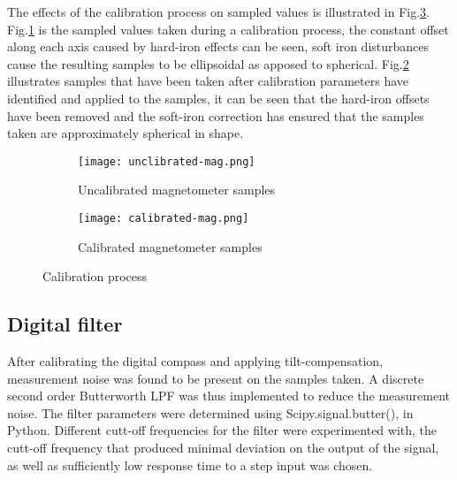 The effects of the calibration process on sampled values is illustrated in Fig.\ref{fig:calibration}. Fig.\ref{fig:uncalibrated} is the sampled values taken during a calibration process, the constant
offset along each axis caused by hard-iron effects can be seen, soft iron disturbances cause the resulting samples to be ellipsoidal as apposed to spherical. Fig.\ref{fig:calibrated} illustrates 
samples that have been taken after calibration parameters have identified and applied to the samples, it can be seen that the hard-iron offsets have been removed and the soft-iron correction has 
ensured that the samples taken are approximately spherical in shape. 

\begin{figure}
    \centering
    \begin{subfigure}[!h]{=0.4\linewidth}
        \texttt{[image: unclibrated-mag.png]}
        \caption{Uncalibrated magnetometer samples}
        \label{fig:uncalibrated}
    \end{subfigure}
    \hfill
    \begin{subfigure}[!h]{0.4\linewidth}
        \texttt{[image: calibrated-mag.png]}
        \caption{Calibrated magnetometer samples}
        \label{fig:calibrated}
    \end{subfigure}
    \caption{Calibration process}
    \label{fig:calibration}
\end{figure}



\subsection{Digital filter}
After calibrating the digital compass and applying tilt-compensation, measurement noise was found to be present on the samples taken. A discrete second order Butterworth LPF was thus implemented to 
reduce the measurement noise. The filter parameters were determined using Scipy.signal.butter(), in Python. Different cutt-off frequencies for the filter were experimented with, the cutt-off frequency 
that produced minimal deviation on the output of the signal, as well as sufficiently low response time to a step input was chosen. 

